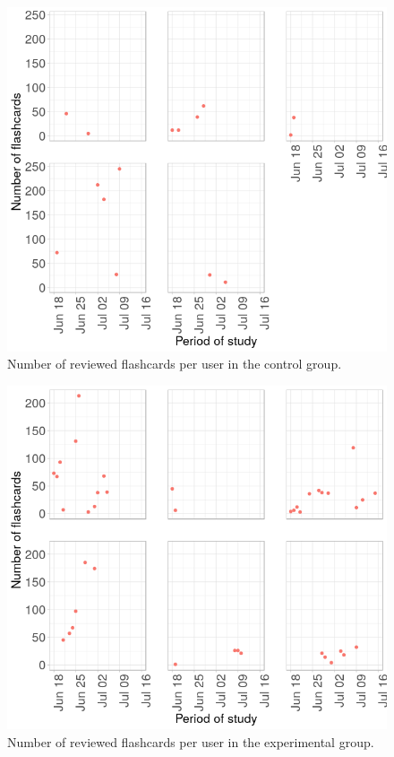 \begin{figure}[htb]
    \vskip 5mm
        \begin{center}
            \includegraphics[scale=0.75]{./Figures/con_n_flashcards.png}
            \caption{Number of reviewed flashcards per user in the control group.}
            \label{fig:cards-control}
        \end{center}
    \vskip -5mm
\end{figure}

\begin{figure}[htb]
    \vskip 5mm
        \begin{center}
            \includegraphics[scale=0.75]{./Figures/exp_n_flashcards.png}
            \caption{Number of reviewed flashcards per user in the experimental group.}
            \label{fig:cards-experimental}
        \end{center}
    \vskip -5mm
\end{figure}

